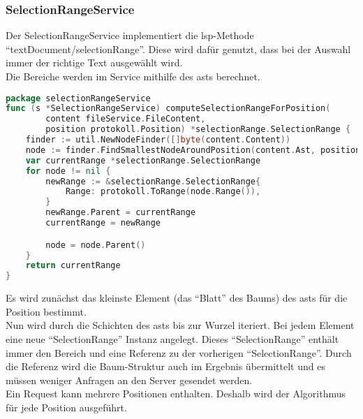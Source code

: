 \documentclass[./einleitung.tex]{subfiles}
\begin{document}
    \subsubsection[SelectionRangeService]{SelectionRangeService }\label{subsubsec:selection-service}
    Der SelectionRangeService implementiert die \acrshort{lsp}-Methode ``textDocument/selectionRange''.
    Diese wird dafür genutzt, dass bei der Auswahl immer der richtige Text ausgewählt wird. \\
    Die Bereiche werden im Service mithilfe des \acrshort{ast}s berechnet.
    \begin{lstlisting}[language=Go]
package selectionRangeService
func (s *SelectionRangeService) computeSelectionRangeForPosition(
        content fileService.FileContent,
        position protokoll.Position) *selectionRange.SelectionRange {
	finder := util.NewNodeFinder([]byte(content.Content))
	node := finder.FindSmallestNodeAroundPosition(content.Ast, position)
	var currentRange *selectionRange.SelectionRange
	for node != nil {
		newRange := &selectionRange.SelectionRange{
			Range: protokoll.ToRange(node.Range()),
		}
		newRange.Parent = currentRange
		currentRange = newRange

		node = node.Parent()
	}
	return currentRange
}
    \end{lstlisting}
    Es wird zunächst das kleinste Element (das ``Blatt'' des Baums) des \acrshort{ast}s für die Position bestimmt.\\
    Nun wird durch die Schichten des \acrshort{ast}s bis zur Wurzel iteriert.
    Bei jedem Element eine neue ``SelectionRange'' Instanz  angelegt.
    Dieses ``SelectionRange'' enthält immer den Bereich und eine Referenz zu der vorherigen ``SelectionRange''.
    Durch die Referenz wird die Baum-Struktur auch im Ergebnis übermittelt und es müssen weniger Anfragen an den Server gesendet werden.\\

    Ein Request kann mehrere Positionen enthalten.
    Deshalb wird der Algorithmus für jede Position ausgeführt.
\end{document}
